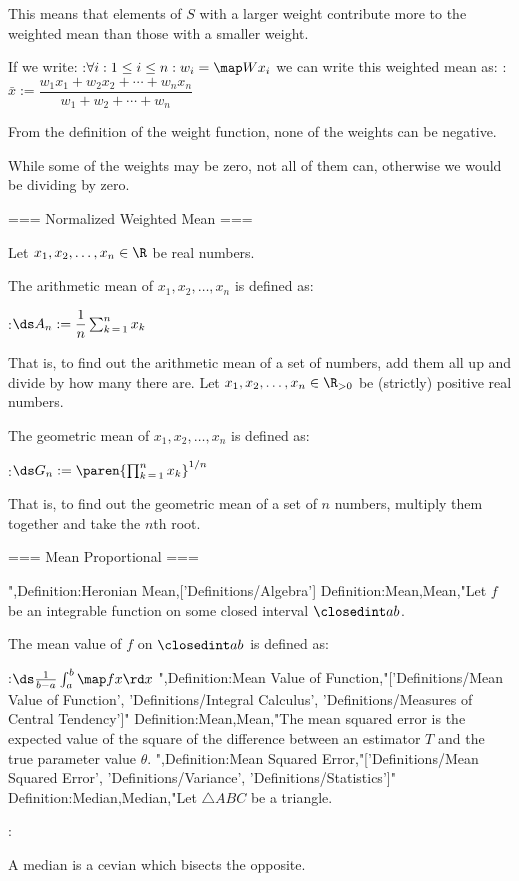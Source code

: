 This means that elements of $S$ with a larger weight contribute more to the weighted mean than those with a smaller weight.


If we write:
:$\forall i: 1 \le i \le n: w_i = \map W {x_i}$
we can write this weighted mean as:
:$\bar x := \dfrac {w_1 x_1 + w_2 x_2 + \cdots + w_n x_n} {w_1 + w_2 + \cdots + w_n}$


From the definition of the weight function, none of the weights can be negative.

While some of the weights may be zero, not all of them can, otherwise we would be dividing by zero.


=== Normalized Weighted Mean ===

Let $x_1, x_2, \ldots, x_n \in \R$ be real numbers.

The arithmetic mean of $x_1, x_2, \ldots, x_n$ is defined as:

:$\ds A_n := \dfrac 1 n \sum_{k \mathop = 1}^n x_k$

That is, to find out the arithmetic mean of a set of numbers, add them all up and divide by how many there are.
Let $x_1, x_2, \ldots, x_n \in \R_{>0}$ be (strictly) positive real numbers.

The geometric mean of $x_1, x_2, \ldots, x_n$ is defined as:

:$\ds G_n := \paren {\prod_{k \mathop = 1}^n x_k}^{1/n}$


That is, to find out the geometric mean of a set of $n$ numbers, multiply them together and take the $n$th root.


=== Mean Proportional ===

",Definition:Heronian Mean,['Definitions/Algebra']
Definition:Mean,Mean,"Let $f$ be an integrable function on some closed interval $\closedint a b$.

The mean value of $f$ on $\closedint a b$ is defined as:

:$\ds \frac 1 {b - a} \int_a^b \map f x \rd x$
",Definition:Mean Value of Function,"['Definitions/Mean Value of Function', 'Definitions/Integral Calculus', 'Definitions/Measures of Central Tendency']"
Definition:Mean,Mean,"The mean squared error is the expected value of the square of the difference between an estimator $T$ and the true parameter value $\theta$.
",Definition:Mean Squared Error,"['Definitions/Mean Squared Error', 'Definitions/Variance', 'Definitions/Statistics']"
Definition:Median,Median,"Let $\triangle ABC$ be a triangle.

:

A median is a cevian which bisects the opposite.


